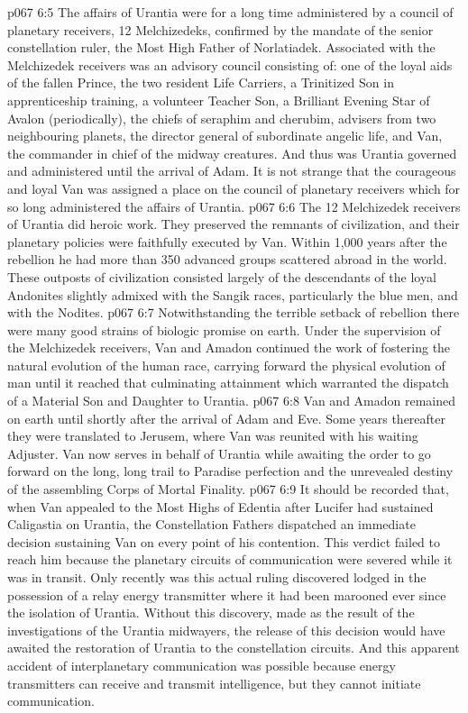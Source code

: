 \vs p067 6:5 \pc The affairs of Urantia were for a long time administered by a council of planetary receivers, 12 Melchizedeks, confirmed by the mandate of the senior constellation ruler, the Most High Father of Norlatiadek. Associated with the Melchizedek receivers was an advisory council consisting of: one of the loyal aids of the fallen Prince, the two resident Life Carriers, a Trinitized Son in apprenticeship training, a volunteer Teacher Son, a Brilliant Evening Star of Avalon (periodically), the chiefs of seraphim and cherubim, advisers from two neighbouring planets, the director general of subordinate angelic life, and Van, the commander in chief of the midway creatures. And thus was Urantia governed and administered until the arrival of Adam. It is not strange that the courageous and loyal Van was assigned a place on the council of planetary receivers which for so long administered the affairs of Urantia.
\vs p067 6:6 The 12 Melchizedek receivers of Urantia did heroic work. They preserved the remnants of civilization, and their planetary policies were faithfully executed by Van. Within 1,000 years after the rebellion he had more than 350 advanced groups scattered abroad in the world. These outposts of civilization consisted largely of the descendants of the loyal Andonites slightly admixed with the Sangik races, particularly the blue men, and with the Nodites.
\vs p067 6:7 Notwithstanding the terrible setback of rebellion there were many good strains of biologic promise on earth. Under the supervision of the Melchizedek receivers, Van and Amadon continued the work of fostering the natural evolution of the human race, carrying forward the physical evolution of man until it reached that culminating attainment which warranted the dispatch of a Material Son and Daughter to Urantia.
\vs p067 6:8 \pc Van and Amadon remained on earth until shortly after the arrival of Adam and Eve. Some years thereafter they were translated to Jerusem, where Van was reunited with his waiting Adjuster. Van now serves in behalf of Urantia while awaiting the order to go forward on the long, long trail to Paradise perfection and the unrevealed destiny of the assembling Corps of Mortal Finality.
\vs p067 6:9 \pc It should be recorded that, when Van appealed to the Most Highs of Edentia after Lucifer had sustained Caligastia on Urantia, the Constellation Fathers dispatched an immediate decision sustaining Van on every point of his contention. This verdict failed to reach him because the planetary circuits of communication were severed while it was in transit. Only recently was this actual ruling discovered lodged in the possession of a relay energy transmitter where it had been marooned ever since the isolation of Urantia. Without this discovery, made as the result of the investigations of the Urantia midwayers, the release of this decision would have awaited the restoration of Urantia to the constellation circuits. And this apparent accident of interplanetary communication was possible because energy transmitters can receive and transmit intelligence, but they cannot initiate communication.

